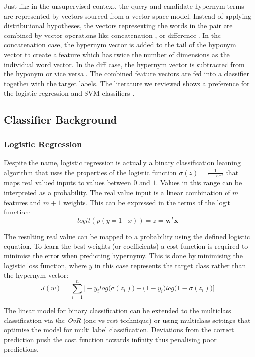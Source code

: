 Just like in the unsupervised context, the query and candidate hypernym terms are represented by vectors sourced from a vector space model.  Instead of applying distributional hypotheses, the vectors representing the words in the pair are combined by vector operations like concatenation \citep{baroni2012entailment}, or difference \citep{roller2014inclusive}.  In the concatenation case, the hypernym vector is added to the tail of the hyponym vector to create a feature which has twice the number of dimensions as the individual word vector.  In the diff case, the hypernym vector is subtracted from the hyponym \citep{roller2014inclusive} or vice versa \citep{shwartz2017siege}.  The combined feature vectors are fed into a classifier together with the target labels.  The literature we reviewed shows a preference for the logistic regression \citep{roller2014inclusive, shwartz2017siege, levy2015supervised, yamane2016distributional, bernier2018crim} and \ac{SVM} classifiers \citep{shwartz2017siege, levy2015supervised, baroni2012entailment}.

\subsection{Classifier Background}
\subsubsection{Logistic Regression}
Despite the name, logistic regression is actually a binary classification learning algorithm that uses the properties of the logistic function $\sigma(z)=\frac{1}{1 + e^{-z}}$ that maps real valued inputs to values between $0$ and $1$.  Values in this range can be interpreted as a probability. The real value input is a linear combination of $m$ features and $m+1$ weights.  This can be expressed in the terms of the logit function: \[logit(p(y = 1 \mid x)) = z = \textbf{w}^T\textbf{x}\]

The resulting real value can be mapped to a probability using the defined logistic equation.  To learn the best weights (or coefficients) a cost function is required to minimise the error when predicting hypernymy.  This is done by minimising the logistic loss function, where $y$ in this case represents the target class rather than the hypernym vector: 
\[J(w) = \sum_{i=1}^{n}\Big[ -y_i log\big(\sigma(z_i)\big) - \big(1 - y_i \big) log\big(1-\sigma(z_i) \big) \Big] \] 

The linear model for binary classification can be extended to the multiclass classification via the \textit{OvR} (one vs rest technique) or using multiclass settings that optimise the model for multi label classification.  Deviations from the correct prediction push the cost function towards infinity thus penalising poor predictions. 


